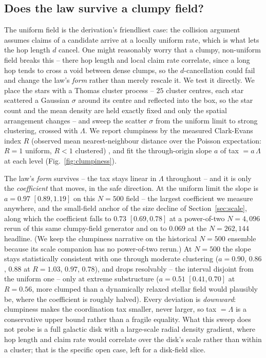 \subsection{Does the law survive a clumpy field?}
\label{sec:clumpy}
The uniform field is the derivation's friendliest case: the collision argument assumes claims of a
candidate arrive at a locally uniform rate, which is what lets the hop length $d$ cancel. One might
reasonably worry that a clumpy, non-uniform field breaks this -- there hop length and local claim rate
correlate, since a long hop tends to cross a void between dense clumps, so the $d$-cancellation could
fail and change the law's \emph{form} rather than merely rescale it. We test it directly. We place the
stars with a Thomas cluster process -- $25$ cluster centres, each star scattered a Gaussian $\sigma$
around its centre and reflected into the box, so the star count and the mean density are held exactly
fixed and only the spatial arrangement changes -- and sweep the scatter $\sigma$ from the uniform
limit to strong clustering, crossed with $\Lambda$. We report clumpiness by the measured Clark-Evans
index $R$ (observed mean nearest-neighbour distance over the Poisson expectation: $R = 1$ uniform,
$R < 1$ clustered) \citep{clark-evans-1954}, and fit the through-origin slope $a$ of tax $= a\,\Lambda$
at each level (Fig.~\ref{fig:clumpiness}).

The law's \emph{form} survives -- the tax stays linear in $\Lambda$ throughout -- and it is only the
\emph{coefficient} that moves, in the safe direction. At the uniform limit the slope is $a =
0.97$ $[0.89, 1.19]$ on this $N = 500$ field -- the largest coefficient we measure anywhere, and the
small-field anchor of the size decline of Section~\ref{sec:scale}, along which the coefficient falls
to $0.73$ $[0.69, 0.78]$ at a power-of-two $N = 4{,}096$ rerun of this same clumpy-field generator and
on to $0.069$ at the $N = 262{,}144$ headline. (We keep the clumpiness narrative on the historical
$N = 500$ ensemble because its scale companion has no power-of-two rerun.) At $N = 500$ the slope
stays statistically consistent with one through moderate clustering ($a = 0.90$, $0.86$, $0.88$ at
$R = 1.03$, $0.97$, $0.78$), and drops resolvably -- the interval disjoint from the uniform one -- only at
extreme substructure ($a = 0.51$ $[0.41, 0.70]$ at $R = 0.56$, more clumped than a dynamically
relaxed stellar field would plausibly be, where the coefficient is roughly halved). Every deviation
is \emph{downward}: clumpiness makes the coordination tax smaller, never larger, so tax $= \Lambda$
is a conservative upper bound rather than a fragile equality. What this sweep does not probe is a
full galactic disk with a large-scale radial density gradient, where hop length and claim rate would
correlate over the disk's scale rather than within a cluster; that is the specific open case, left
for a disk-field slice.

